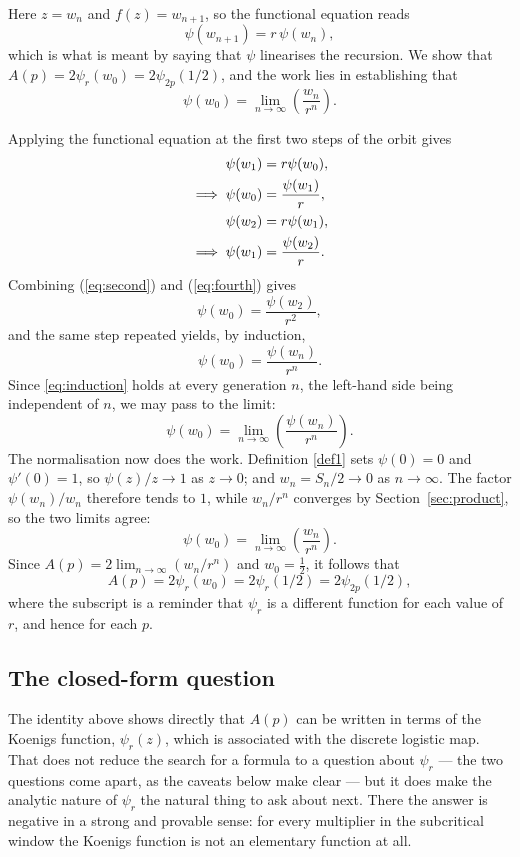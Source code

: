 \documentclass[11pt]{article}
\begin{document}
Here $z=w_n$ and $f(z)=w_{n+1}$, so the functional equation reads
\[
\psi(w_{n+1}) = r\,\psi(w_n),
\]
which is what is meant by saying that $\psi$ linearises the recursion. We show that
$A(p) = 2\psi_r(w_0) = 2\psi_{2p}(1/2)$, and the work lies in establishing that
\[
\psi(w_0) = \lim_{n\to\infty}\left(\frac{w_n}{r^n}\right).
\]

\vspace{10pt}
\noindent
Applying the functional equation at the first two steps of the orbit gives
\begin{align}
\psi(w_1) &= r\psi(w_0), \notag\\
\implies \psi(w_0) &= \frac{\psi(w_1)}{r}, \label{eq:second} \\
\psi(w_2) &= r\psi(w_1), \notag\\
\implies \psi(w_1) &= \frac{\psi(w_2)}{r}. \label{eq:fourth}
\end{align}
Combining (\ref{eq:second}) and (\ref{eq:fourth}) gives
$$\psi(w_0) = \frac{\psi(w_2)}{r^2},$$
and the same step repeated yields, by induction,
\begin{equation}
\psi(w_0) = \frac{\psi(w_n)}{r^n} .
\label{eq:induction}
\end{equation}
Since \eqref{eq:induction} holds at every generation $n$, the left-hand side being independent of $n$, we may pass to the limit:
$$\psi(w_0) = \lim_{n\to\infty}\left(\frac{\psi(w_n)}{r^n}\right).$$
The normalisation now does the work. Definition \ref{def1} sets $\psi(0)=0$ and $\psi'(0)=1$, so $\psi(z)/z\to1$ as $z\to0$; and $w_n=S_n/2\to0$ as $n\to\infty$. The factor $\psi(w_n)/w_n$ therefore tends to $1$, while $w_n/r^n$ converges by Section~\ref{sec:product}, so the two limits agree:
$$\psi(w_0) = \lim_{n\to\infty}\left(\frac{w_n}{r^n}\right).$$
Since $A(p) = 2\lim_{n\to\infty}(w_n/r^n)$ and $w_0=\tfrac12$, it follows that
\[
A(p) = 2\psi_r(w_0) = 2\psi_r(1/2) = 2\psi_{2p}(1/2),
\]
where the subscript is a reminder that $\psi_r$ is a different function for each value of $r$, and hence for each $p$.

\subsection{The closed-form question}
\label{sec:closedform}

The identity above shows directly that $A(p)$ can be written in terms of the Koenigs function, $\psi_r(z)$, which is associated with the discrete logistic map. That does not reduce the search for a formula to a question about $\psi_r$ --- the two questions come apart, as the caveats below make clear --- but it does make the analytic nature of $\psi_r$ the natural thing to ask about next. There the answer is negative in a strong and provable sense: for every multiplier in the subcritical window the Koenigs function is not an elementary function at all.
\end{document}
